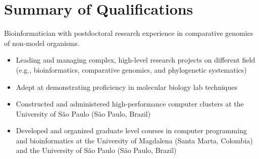 
\vspace{-2.5em}

\section{Summary of Qualifications}
Bioinformatician with postdoctoral research experience in comparative genomics of non-model organisms.
\begin{itemize}
    \item Leading and managing complex, high-level research projects on different field (e.g., bioinformatics, comparative genomics, and phylogenetic systematics)
    \item Adept at demonstrating proficiency in molecular biology lab techniques
    \item Constructed and administered high-performance computer clusters at the University of São Paulo (São Paulo, Brazil)
    \item Developed and organized graduate level courses in computer programming and bioinformatics at the University of Magdalena (Santa Marta, Colombia) and the University of São Paulo (São Paulo, Brazil)
\end{itemize}
